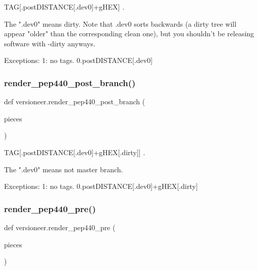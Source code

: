 \begin{DoxyVerb}TAG[.postDISTANCE[.dev0]+gHEX] .

The ".dev0" means dirty. Note that .dev0 sorts backwards
(a dirty tree will appear "older" than the corresponding clean one),
but you shouldn't be releasing software with -dirty anyways.

Exceptions:
1: no tags. 0.postDISTANCE[.dev0]
\end{DoxyVerb}
 \mbox{\label{namespaceversioneer_aa5a422af4804aafb129d4206d50d1816}} 
\subsubsection{\texorpdfstring{render\+\_\+pep440\+\_\+post\+\_\+branch()}{render\_pep440\_post\_branch()}}
{\footnotesize\ttfamily def versioneer.\+render\+\_\+pep440\+\_\+post\+\_\+branch (\begin{DoxyParamCaption}\item[{}]{pieces }\end{DoxyParamCaption})}

\begin{DoxyVerb}TAG[.postDISTANCE[.dev0]+gHEX[.dirty]] .

The ".dev0" means not master branch.

Exceptions:
1: no tags. 0.postDISTANCE[.dev0]+gHEX[.dirty]
\end{DoxyVerb}
 \mbox{\label{namespaceversioneer_a63ca46b89d8dc2fe09c7e3d65cc44f71}} 
\subsubsection{\texorpdfstring{render\+\_\+pep440\+\_\+pre()}{render\_pep440\_pre()}}
{\footnotesize\ttfamily def versioneer.\+render\+\_\+pep440\+\_\+pre (\begin{DoxyParamCaption}\item[{}]{pieces }\end{DoxyParamCaption})}


